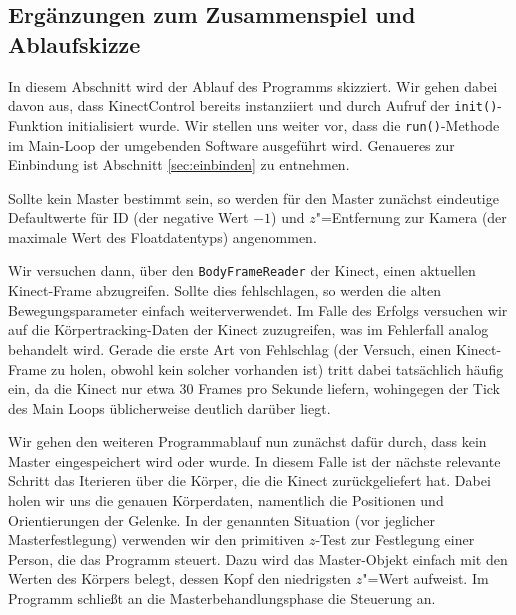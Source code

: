 \subsection{Ergänzungen zum Zusammenspiel und Ablaufskizze}
In diesem Abschnitt wird der Ablauf des Programms skizziert. Wir gehen dabei davon aus, dass KinectControl bereits instanziiert und durch Aufruf der \texttt{init()}-Funktion initialisiert wurde. Wir stellen uns weiter vor, dass die \texttt{run()}-Methode im Main-Loop der umgebenden Software ausgeführt wird. Genaueres zur Einbindung ist Abschnitt \ref{sec:einbinden} zu entnehmen.\par 
Sollte kein Master bestimmt sein, so werden für den Master zunächst eindeutige Defaultwerte für ID (der negative Wert $-1$) und $z$"=Entfernung zur Kamera (der maximale Wert des Floatdatentyps) angenommen.\par 
Wir versuchen dann, über den \texttt{BodyFrameReader} der Kinect, einen aktuellen Kinect-Frame abzugreifen. Sollte dies fehlschlagen, so werden die alten Bewegungsparameter einfach weiterverwendet. Im Falle des Erfolgs versuchen wir auf die Körpertracking-Daten der Kinect zuzugreifen, was im Fehlerfall analog behandelt wird. Gerade die erste Art von Fehlschlag (der Versuch, einen Kinect-Frame zu holen, obwohl kein solcher vorhanden ist) tritt dabei tatsächlich häufig ein, da die Kinect nur etwa 30 Frames pro Sekunde liefern, wohingegen der Tick des Main Loops üblicherweise deutlich darüber liegt.\par\medskip
Wir gehen den weiteren Programmablauf nun zunächst dafür durch, dass kein Master eingespeichert wird oder wurde. In diesem Falle ist der nächste relevante Schritt das Iterieren über die Körper, die die Kinect zurückgeliefert hat. Dabei holen wir uns die genauen Körperdaten, namentlich die Positionen und Orientierungen der Gelenke. In der genannten Situation (vor jeglicher Masterfestlegung) verwenden wir den primitiven $z$-Test zur Festlegung einer Person, die das Programm steuert. Dazu wird das Master-Objekt einfach mit den Werten des Körpers belegt, dessen Kopf den niedrigsten $z$"=Wert aufweist. Im Programm schließt an die Masterbehandlungsphase die Steuerung an.\par 
